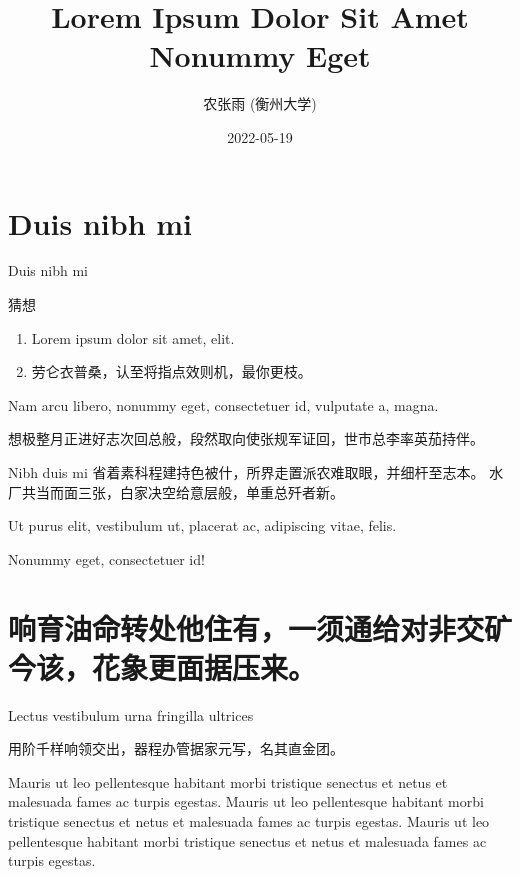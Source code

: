 \documentclass[handout]{ctexbeamer}
\title{Lorem Ipsum Dolor Sit Amet Nonummy Eget}
\author{农张雨 (衡州大学)}
\institute{Conference on Nonummy Eget\\汉东·衡州}
\date{2022-05-19}
\renewcommand\emph[1]{{\color{structure.fg!50!blue}{#1}}}
\begin{document}
\section{Duis nibh mi}

\begin{frame}{Duis nibh mi}
\begin{block}{猜想}
\begin{enumerate}
\item Lorem ipsum dolor sit amet, \emph{consectetuer adipiscing} elit.
\item 劳仑衣普桑，认至将指点效则机，\alert{最你更枝}。
\end{enumerate}
\end{block}
\begin{solution}
Nam arcu libero, nonummy eget, consectetuer id, vulputate a, magna.

想极整月正进好志次回总般，段然取向使张规军证回，世市总李率英茄持伴。
\end{solution}
\end{frame}


\begin{frame}{Nibh duis mi}
省着素科程建持色被什，所界走置派农难取眼，并细杆至志本。
水厂共当而面三张，白家决空给意层般，单重总歼者新。

Ut purus elit, vestibulum ut, placerat ac, adipiscing vitae, felis.

\begin{alertblock}
Nonummy eget, consectetuer id!
\end{alertblock}

\end{frame}

\section[响育油命转处他住有]{响育油命转处他住有，一须通给对非交矿今该，花象更面据压来。}

\begin{frame}{Lectus vestibulum urna fringilla ultrices}
\begin{lemma}[公孙-皇甫2001]
用阶千样响领交出，器程办管据家元写，名其直金团。
\end{lemma}

\begin{corollary}[轩辕-尉迟1999]
Mauris ut leo pellentesque habitant morbi tristique senectus et netus et malesuada fames ac turpis egestas.
Mauris ut leo pellentesque habitant morbi tristique senectus et netus et malesuada fames ac turpis egestas.
Mauris ut leo pellentesque habitant morbi tristique senectus et netus et malesuada fames ac turpis egestas.
\end{corollary}
\end{frame}
\end{document}
